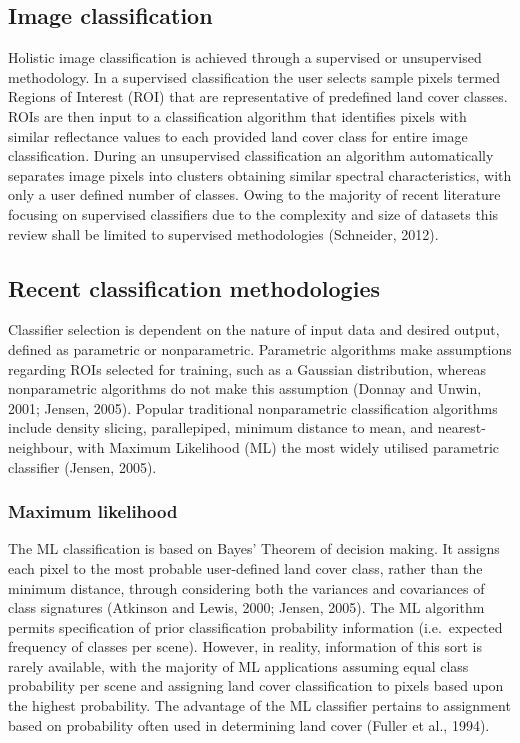 \documentclass[]{book}
\begin{document}
\subsection{Image classification}\label{image-classification}

Holistic image classification is achieved through a supervised or
unsupervised methodology. In a supervised classification the user
selects sample pixels termed Regions of Interest (ROI) that are
representative of predefined land cover classes. ROIs are then input to
a classification algorithm that identifies pixels with similar
reflectance values to each provided land cover class for entire image
classification. During an unsupervised classification an algorithm
automatically separates image pixels into clusters obtaining similar
spectral characteristics, with only a user defined number of classes.
Owing to the majority of recent literature focusing on supervised
classifiers due to the complexity and size of datasets this review shall
be limited to supervised methodologies (Schneider, 2012).

\subsection{Recent classification
methodologies}\label{recent-classification-methodologies}

Classifier selection is dependent on the nature of input data and
desired output, defined as parametric or nonparametric. Parametric
algorithms make assumptions regarding ROIs selected for training, such
as a Gaussian distribution, whereas nonparametric algorithms do not make
this assumption (Donnay and Unwin, 2001; Jensen, 2005). Popular
traditional nonparametric classification algorithms include density
slicing, parallepiped, minimum distance to mean, and nearest-neighbour,
with Maximum Likelihood (ML) the most widely utilised parametric
classifier (Jensen, 2005).

\subsubsection{Maximum likelihood}\label{maximum-likelihood}

The ML classification is based on Bayes' Theorem of decision making. It
assigns each pixel to the most probable user-defined land cover class,
rather than the minimum distance, through considering both the variances
and covariances of class signatures (Atkinson and Lewis, 2000; Jensen,
2005). The ML algorithm permits specification of prior classification
probability information (i.e.~expected frequency of classes per scene).
However, in reality, information of this sort is rarely available, with
the majority of ML applications assuming equal class probability per
scene and assigning land cover classification to pixels based upon the
highest probability. The advantage of the ML classifier pertains to
assignment based on probability often used in determining land cover
(Fuller et al., 1994).
\end{document}
